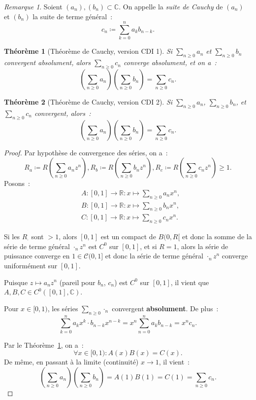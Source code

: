 \documentclass{report}
\newtheorem{thm}{Théorème}[chapter]
\theoremstyle{definition}
\theoremstyle{remark}
\newtheorem*{rmq}{Remarque}
\newcommand{\C}{\mathbb C}
\newcommand{\R}{\mathbb R}
\newcommand{\CDII}{{CDI 1}}
\newcommand{\CDIII}{{CDI 2}}
\begin{document}
			\begin{rmq} Soient $(a_n), (b_n) \subset \C$. On appelle la \textit{suite de Cauchy} de $(a_n)$ et $(b_n)$ la suite de terme général~:
			\[c_n \coloneqq \sum_{k=0}^na_kb_{n-k}.\]
			\end{rmq}

			\begin{thm}[Théorème de Cauchy, version \CDII]\label{thm:CauchyCDI1} Si $\sum_{n \geq 0}a_n$ et $\sum_{n \geq 0}b_n$ convergent absolument,
			alors $\sum_{n \geq 0}c_n$ converge absolument, et on a~:
			\[\left(\sum_{n \geq 0}a_n\right)\left(\sum_{n \geq 0}b_n\right) = \sum_{n \geq 0}c_n.\]
			\end{thm}

			\begin{thm}[Théorème de Cauchy, version \CDIII] Si $\sum_{n \geq 0}a_n$, $\sum_{n \geq 0}b_n$, et $\sum_{n \geq 0}c_n$ convergent, alors~:
			\[\left(\sum_{n \geq 0}a_n\right)\left(\sum_{n \geq 0}b_n\right) = \sum_{n \geq 0}c_n.\]
			\end{thm}

			\begin{proof} Par hypothèse de convergence des séries, on a~:
			\[R_a \coloneqq R\left(\sum_{n \geq 0}a_nz^n\right), R_b \coloneqq R\left(\sum_{n \geq 0}b_nz^n\right), R_c \coloneqq R\left(\sum_{n \geq 0}c_nz^n\right)
				\geq 1.\]
			Posons~:
			\begin{align*}
				&A : [0, 1] \to \R : x \mapsto \sum_{n \geq 0}a_nx^n, \\
				&B : [0, 1] \to \R : x \mapsto \sum_{n \geq 0}b_nx^n, \\
				&C : [0, 1] \to \R : x \mapsto \sum_{n \geq 0}c_nx^n.
			\end{align*}

			Si les $R_\cdot$ sont $> 1$, alors $[0, 1]$ est un compact de $B(0, R[$ et donc la somme de la série de terme général $\cdot_nz^n$ est $C^0$ sur
			$[0, 1]$, et si $R=1$, alors la série de puissance converge en $1 \in \mathcal C(0, 1]$ et donc la série de terme général $\cdot_nz^n$ converge
			uniformément sur $[0, 1]$.

			Puisque $z \mapsto a_nz^n$ (pareil pour $b_n$, $c_n$) est $C^0$ sur $[0, 1]$, il vient que $A, B, C \in C^0([0, 1], \C)$.

			Pour $x \in [0, 1)$, les séries $\sum_{n \geq 0}\cdot_n$ convergent \textbf{absolument}. De plus~:
			\[\sum_{k=0}^na_kx^k\cdot b_{n-k}x^{n-k} = x^n\sum_{n=0}^na_kb_{n-k} = x^nc_n.\]

			Par le Théorème~\ref{thm:CauchyCDI1}, on a~:
			\[\forall x \in [0, 1) : A(x)B(x) = C(x).\]
			De même, en passant à la limite (continuité) $x \to 1$, il vient~:
			\[\left(\sum_{n \geq 0}a_n\right)\left(\sum_{n \geq 0}b_n\right) = A(1)B(1) = C(1) = \sum_{n\geq 0}c_n.\]
			\end{proof}
\end{document}
